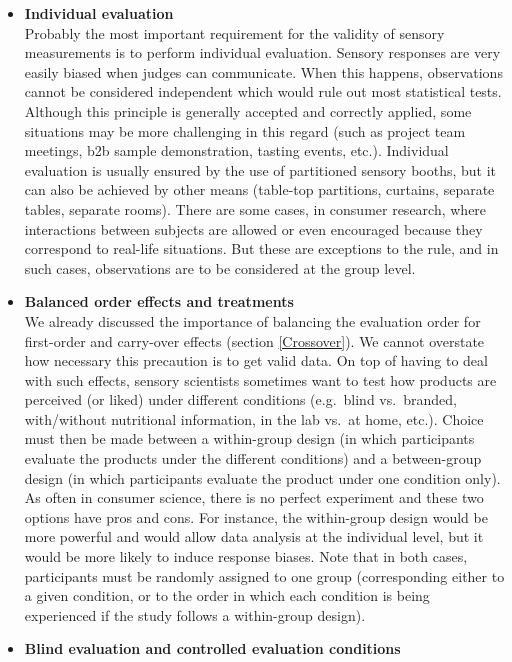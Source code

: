 \documentclass[
]{krantz}
\begin{document}
\begin{itemize}
\item
  \textbf{Individual evaluation}\\
  Probably the most important requirement for the validity of sensory measurements is to perform individual evaluation. Sensory responses are very easily biased when judges can communicate. When this happens, observations cannot be considered independent which would rule out most statistical tests. Although this principle is generally accepted and correctly applied, some situations may be more challenging in this regard (such as project team meetings, b2b sample demonstration, tasting events, etc.). Individual evaluation is usually ensured by the use of partitioned sensory booths, but it can also be achieved by other means (table-top partitions, curtains, separate tables, separate rooms). There are some cases, in consumer research, where interactions between subjects are allowed or even encouraged because they correspond to real-life situations. But these are exceptions to the rule, and in such cases, observations are to be considered at the group level.
\item
  \textbf{Balanced order effects and treatments}\\
  We already discussed the importance of balancing the evaluation order for first-order and carry-over effects (section \ref{Crossover}). We cannot overstate how necessary this precaution is to get valid data. On top of having to deal with such effects, sensory scientists sometimes want to test how products are perceived (or liked) under different conditions (e.g.~blind vs.~branded, with/without nutritional information, in the lab vs.~at home, etc.). Choice must then be made between a within-group design (in which participants evaluate the products under the different conditions) and a between-group design (in which participants evaluate the product under one condition only). As often in consumer science, there is no perfect experiment and these two options have pros and cons. For instance, the within-group design would be more powerful and would allow data analysis at the individual level, but it would be more likely to induce response biases. Note that in both cases, participants must be randomly assigned to one group (corresponding either to a given condition, or to the order in which each condition is being experienced if the study follows a within-group design).
\item
  \textbf{Blind evaluation and controlled evaluation conditions}\\

\end{itemize}
\end{document}
